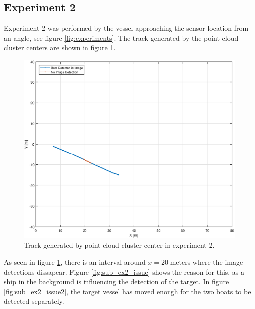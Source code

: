 \subsection{Experiment 2}
Experiment 2 was performed by the vessel approaching the sensor location from an angle, see figure \ref{fig:experiments}. The track generated by the point cloud cluster centers are shown in figure \ref{fig:ex2_track}.
\begin{figure}[H]
	\centering
	\includegraphics[width=.8\linewidth]{fig/exp_2_track.eps}
	\caption{Track generated by point cloud cluster center in experiment 2.}
	\label{fig:ex2_track}
\end{figure}
As seen in figure \ref{fig:ex2_track}, there is an interval around $x=20$ meters where the image detections dissapear. Figure \ref{fig:sub_ex2_issue} shows the reason for this, as a ship in the background is influencing the detection of the target. In figure \ref{fig:sub_ex2_issue2}, the target vessel has moved enough for the two boats to be detected separately.
